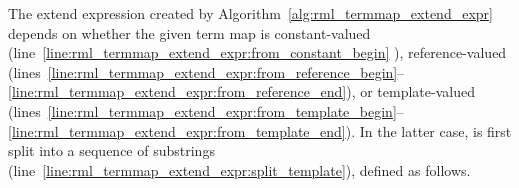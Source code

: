 \begin{algorithm}[t]

\end{algorithm}

The extend expression
	created by Algorithm~\ref{alg:rml_termmap_extend_expr} depends on whether the given
term map is constant-val\-ued
	(line~\ref{line:rml_termmap_extend_expr:from_constant_begin}%
%
), reference-val\-ued (lines~\ref{line:rml_termmap_extend_expr:from_reference_begin}--\ref{line:rml_termmap_extend_expr:from_reference_end}), or template-val\-ued (lines~\ref{line:rml_termmap_extend_expr:from_template_begin}--\ref{line:rml_termmap_extend_expr:from_template_end}). In the latter case,
is first split into a sequence of substrings (line~\ref{line:rml_termmap_extend_expr:split_template}), defined as follows.

\enlargethispage{\baselineskip}%
\vspace{-1mm} %

